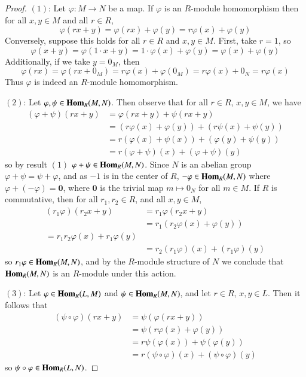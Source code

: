 \begin{proof}
    $(1)$: Let $\varphi:M\rightarrow N$ be a map. If $\varphi$ is an $R$-module homomorphism then for all $x,y \in M$ and all $r \in R$, $$\varphi(rx+y) = \varphi(rx)+\varphi(y) = r\varphi(x)+\varphi(y)$$ Conversely, suppose this holds for all $r \in R$ and $x,y \in M$. First, take $r = 1$, so $$\varphi(x+y) = \varphi(1\cdot x + y) = 1\cdot \varphi(x)+\varphi(y) = \varphi(x)+\varphi(y)$$ Additionally, if we take $y = 0_M$, then \begin{equation*}
        \varphi(rx) = \varphi(rx+0_M) = r\varphi(x)+\varphi(0_M) = r\varphi(x)+0_N = r\varphi(x)
    \end{equation*}
    Thus $\varphi$ is indeed an $R$-module homomorphism.

    $(2)$: Let $\varphi,\psi \in \mathbf{Hom}_R(M,N)$. Then observe that for all $r \in R$, $x,y \in M$, we have \begin{align*}
        (\varphi+\psi)(rx+y) &= \varphi(rx+y)+\psi(rx+y) \\
        &= (r\varphi(x)+\varphi(y))+(r\psi(x)+\psi(y)) \\
        &= r(\varphi(x)+\psi(x))+(\varphi(y)+\psi(y)) \\
        &= r(\varphi+\psi)(x)+(\varphi+\psi)(y)
    \end{align*}
    so by result $(1)$ $\varphi + \psi \in \mathbf{Hom}_R(M,N)$. Since $N$ is an abelian group $\varphi+\psi = \psi + \varphi$, and as $-1$ is in the center of $R$, $-\varphi \in \mathbf{Hom}_R(M,N)$ where $\varphi+(-\varphi) = \mathbf{0}$, where $\mathbf{0}$ is the trivial map $m \mapsto 0_N$ for all $m \in M$. If $R$ is commutative, then for all $r_1, r_2 \in R$, and all $x,y \in M$, \begin{align*}
        (r_1\varphi)(r_2x+y) &= r_1\varphi(r_2x+y) \\
        &= r_1(r_2\varphi(x)+\varphi(y)) \\
        = r_1r_2\varphi(x)+r_1\varphi(y) \\
        &= r_2(r_1\varphi)(x)+(r_1\varphi)(y)
    \end{align*}
    so $r_1\varphi \in \mathbf{Hom}_R(M,N)$, and by the $R$-module structure of $N$ we conclude that $\mathbf{Hom}_R(M,N)$ is an $R$-module under this action.

    $(3)$: Let $\varphi \in \mathbf{Hom}_R(L,M)$ and $\psi \in \mathbf{Hom}_R(M,N)$, and let $r \in R$, $x,y \in L$. Then it follows that \begin{align*}
        (\psi\circ \varphi)(rx+y) &= \psi(\varphi(rx+y)) \\
        &= \psi(r\varphi(x)+\varphi(y)) \\
        &= r\psi(\varphi(x)) + \psi(\varphi(y)) \\
        &= r(\psi\circ \varphi)(x)+(\psi\circ \varphi)(y)
    \end{align*}
    so $\psi \circ \varphi \in \mathbf{Hom}_R(L,N)$.



\end{proof}
